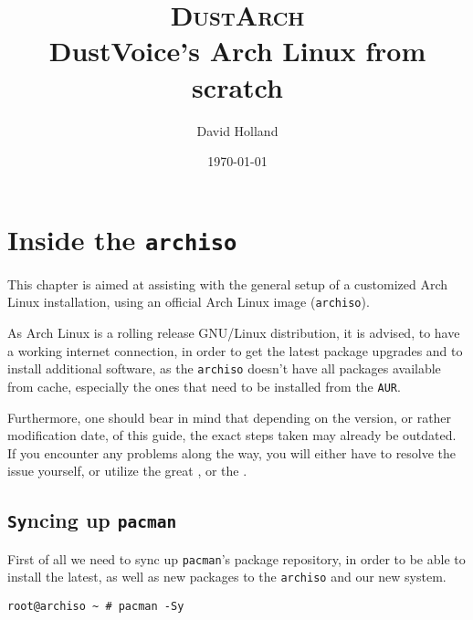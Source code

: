 \documentclass[10pt]{dustdoc}
\title{\texorpdfstring{{\scshape{\Huge DustArch}\\{\normalsize\vspace{2.5em}}}}{DustArch: }DustVoice’s Arch Linux from scratch}
\author{David Holland}
\date{\today{}}
\begin{document}
\maketitle

\tableofcontents

\chapter{Inside the \texttt{archiso}}
\label{sec:inside-the-archiso}

This chapter is aimed at assisting with the general setup of a customized Arch Linux installation, using an official Arch Linux image (\texttt{archiso}).

\begin{NOTE}
    As Arch Linux is a rolling release GNU/Linux distribution, it is advised, to have a working internet connection, in order to get the latest package upgrades and to install additional software, as the \texttt{archiso} doesn't have all packages available from cache, especially the ones that need to be installed from the \texttt{AUR}.

    Furthermore, one should bear in mind that depending on the version, or rather modification date, of this guide, the exact steps taken may already be outdated.
    If you encounter any problems along the way, you will either have to resolve the issue yourself, or utilize the great , or the .
\end{NOTE}

\section{\texttt{Sy}ncing up \texttt{pacman}}
\label{sec:syncing-up-pacman}

First of all we need to sync up \texttt{pacman}'s package repository, in order to be able to install the latest, as well as new packages to the \texttt{archiso} and our new system.

\begin{verbatim}
root@archiso ~ # pacman -Sy
\end{verbatim}

\end{document}

